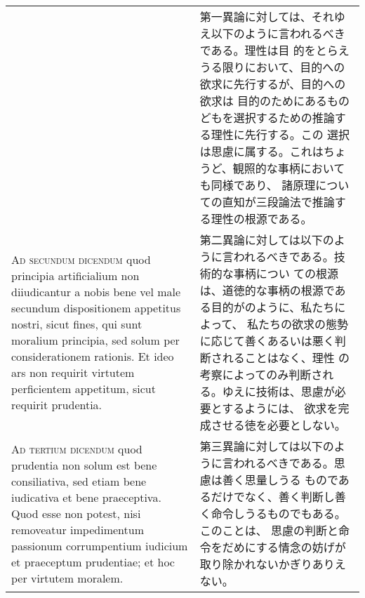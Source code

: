 \documentclass[10pt]{jsarticle}
\begin{document}
\begin{longtable}{p{21em}p{21em}}
&

 第一異論に対しては、それゆえ以下のように言われるべきである。理性は目
 的をとらえうる限りにおいて、目的への欲求に先行するが、目的への欲求は
 目的のためにあるものどもを選択するための推論する理性に先行する。この
 選択は思慮に属する。これはちょうど、観照的な事柄においても同様であり、
 諸原理についての直知が三段論法で推論する理性の根源である。


\\



{\scshape Ad secundum dicendum} quod principia artificialium non
diiudicantur a nobis bene vel male secundum dispositionem appetitus
nostri, sicut fines, qui sunt moralium principia, sed solum per
considerationem rationis. Et ideo ars non requirit virtutem
perficientem appetitum, sicut requirit prudentia.

&

 第二異論に対しては以下のように言われるべきである。技術的な事柄につい
 ての根源は、道徳的な事柄の根源である目的がのように、私たちによって、
 私たちの欲求の態勢に応じて善くあるいは悪く判断されることはなく、理性
 の考察によってのみ判断される。ゆえに技術は、思慮が必要とするようには、
 欲求を完成させる徳を必要としない。

 
\\



{\scshape Ad tertium dicendum} quod prudentia non solum est bene
consiliativa, sed etiam bene iudicativa et bene praeceptiva. Quod esse
non potest, nisi removeatur impedimentum passionum corrumpentium
iudicium et praeceptum prudentiae; et hoc per virtutem moralem.

&

第三異論に対しては以下のように言われるべきである。思慮は善く思量しうる
ものであるだけでなく、善く判断し善く命令しうるものでもある。このことは、
思慮の判断と命令をだめにする情念の妨げが取り除かれないかぎりありえない。
\end{longtable}
\end{document}
